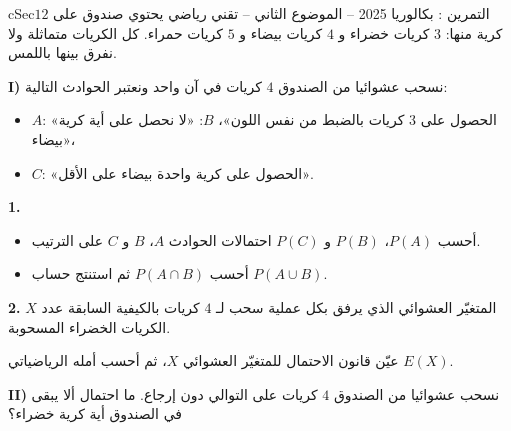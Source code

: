 \documentclass[12pt,a4paper]{article}
\newenvironment{BOX}[2]{\begin{otherlanguage}{english}\begin{arbox}{#1}{#2}}{\end{arbox}\end{otherlanguage}}
\newcounter{exo}
\newenvironment{tamrin}[1]{\stepcounter{exo}\begin{BOX}{cSec}{التمرين \theexo: #1}}{\end{BOX}}
\newenvironment{sq}{\begin{itemize}[leftmargin=2.4em,itemsep=3pt]}{\end{itemize}}
\newcommand{\qa}{\item[(أ)]}\newcommand{\qb}{\item[(ب)]}\newcommand{\qc}{\item[(جـ)]}\newcommand{\qd}{\item[(د)]}\newcommand{\qe}{\item[(هـ)]}
\newcommand{\QQ}[1]{\par\smallskip\textbf{#1.} }
\begin{document}
\begin{tamrin}{بكالوريا 2025 -- الموضوع الثاني -- تقني رياضي}
يحتوي صندوق على $12$ كرية منها: $3$ كريات خضراء و $4$ كريات بيضاء و $5$ كريات حمراء. كل الكريات متماثلة ولا نفرق بينها باللمس.

\textbf{I)} نسحب عشوائيا من الصندوق $4$ كريات في آن واحد ونعتبر الحوادث التالية:
\begin{itemize}
\item $A$: «الحصول على $3$ كريات بالضبط من نفس اللون»، \quad $B$: «لا نحصل على أية كرية بيضاء»،
\item $C$: «الحصول على كرية واحدة بيضاء على الأقل».
\end{itemize}
\QQ{1}
\begin{sq}
\qa أحسب $P(A)$، $P(B)$ و $P(C)$ احتمالات الحوادث $A$، $B$ و $C$ على الترتيب.
\qb أحسب $P(A\cap B)$ ثم استنتج حساب $P(A\cup B)$.
\end{sq}
\QQ{2} $X$ المتغيّر العشوائي الذي يرفق بكل عملية سحب لـ $4$ كريات بالكيفية السابقة عدد الكريات الخضراء المسحوبة.

عيّن قانون الاحتمال للمتغيّر العشوائي $X$، ثم أحسب أمله الرياضياتي $E(X)$.

\textbf{II)} نسحب عشوائيا من الصندوق $4$ كريات على التوالي دون إرجاع. ما احتمال ألا يبقى في الصندوق أية كرية خضراء؟
\end{tamrin}
\end{document}
